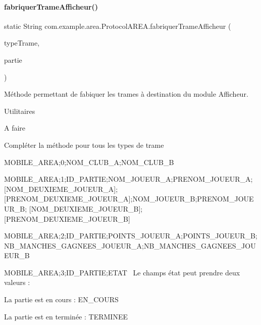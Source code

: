 \paragraph{\texorpdfstring{fabriquer\+Trame\+Afficheur()}{fabriquerTrameAfficheur()}}
{\footnotesize\ttfamily static String com.\+example.\+area.\+Protocol\+A\+R\+E\+A.\+fabriquer\+Trame\+Afficheur (\begin{DoxyParamCaption}\item[{int}]{type\+Trame,  }\item[{\hyperlink{classcom_1_1example_1_1area_1_1_partie}{Partie}}]{partie }\end{DoxyParamCaption})\hspace{0.3cm}{\ttfamily [static]}}



Méthode permettant de fabiquer les trames à destination du module Afficheur. 

Utilitaires \begin{DoxyRefDesc}{A faire}
\item[\hyperlink{todo__todo000006}{A faire}]Compléter la méthode pour tous les types de trame \end{DoxyRefDesc}


M\+O\+B\+I\+L\+E\+\_\+\+A\+R\+EA;0;N\+O\+M\+\_\+\+C\+L\+U\+B\+\_\+A;N\+O\+M\+\_\+\+C\+L\+U\+B\+\_\+B~\newline


M\+O\+B\+I\+L\+E\+\_\+\+A\+R\+EA;1;I\+D\+\_\+\+P\+A\+R\+T\+IE;N\+O\+M\+\_\+\+J\+O\+U\+E\+U\+R\+\_\+A;P\+R\+E\+N\+O\+M\+\_\+\+J\+O\+U\+E\+U\+R\+\_\+A;\mbox{[}N\+O\+M\+\_\+\+D\+E\+U\+X\+I\+E\+M\+E\+\_\+\+J\+O\+U\+E\+U\+R\+\_\+A\mbox{]};\mbox{[}P\+R\+E\+N\+O\+M\+\_\+\+D\+E\+U\+X\+I\+E\+M\+E\+\_\+\+J\+O\+U\+E\+U\+R\+\_\+A\mbox{]};N\+O\+M\+\_\+\+J\+O\+U\+E\+U\+R\+\_\+B;P\+R\+E\+N\+O\+M\+\_\+\+J\+O\+U\+E\+U\+R\+\_\+B; \mbox{[}N\+O\+M\+\_\+\+D\+E\+U\+X\+I\+E\+M\+E\+\_\+\+J\+O\+U\+E\+U\+R\+\_\+B\mbox{]};\mbox{[}P\+R\+E\+N\+O\+M\+\_\+\+D\+E\+U\+X\+I\+E\+M\+E\+\_\+\+J\+O\+U\+E\+U\+R\+\_\+B\mbox{]}~\newline


M\+O\+B\+I\+L\+E\+\_\+\+A\+R\+EA;2;I\+D\+\_\+\+P\+A\+R\+T\+IE;P\+O\+I\+N\+T\+S\+\_\+\+J\+O\+U\+E\+U\+R\+\_\+A;P\+O\+I\+N\+T\+S\+\_\+\+J\+O\+U\+E\+U\+R\+\_\+B; N\+B\+\_\+\+M\+A\+N\+C\+H\+E\+S\+\_\+\+G\+A\+G\+N\+E\+E\+S\+\_\+\+J\+O\+U\+E\+U\+R\+\_\+A;N\+B\+\_\+\+M\+A\+N\+C\+H\+E\+S\+\_\+\+G\+A\+G\+N\+E\+E\+S\+\_\+\+J\+O\+U\+E\+U\+R\+\_\+B~\newline


M\+O\+B\+I\+L\+E\+\_\+\+A\+R\+EA;3;I\+D\+\_\+\+P\+A\+R\+T\+IE;E\+T\+AT~\newline
Le champs état peut prendre deux valeurs \+:
\begin{DoxyItemize}
\item La partie est en cours \+: E\+N\+\_\+\+C\+O\+U\+RS
\item La partie est en terminée \+: T\+E\+R\+M\+I\+N\+EE
\end{DoxyItemize}

